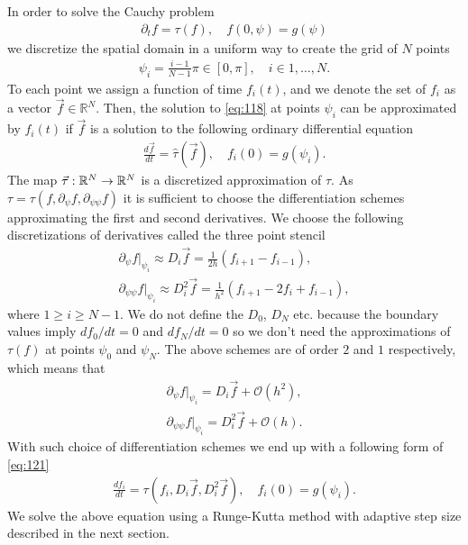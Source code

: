 In order to solve the Cauchy problem
\begin{align}
  \label{eq:118}
  \partial_t f=\tau(f),\quad f(0,\psi)=g(\psi)
\end{align}
we discretize the spatial domain in a uniform way to create the grid
of $N$ points
\begin{align}
  \label{eq:107}
  \psi_i=\frac{i-1}{N-1}\pi\in[0,\pi],\quad i\in{1,\dots,N}.
\end{align}
To each point we assign a function of time $f_i(t)$, and we denote the
set of $f_i$ as a vector $\vec{f}\in\mathbb{R}^N$. Then, the solution
to \eqref{eq:118} at points $\psi_i$ can be approximated by $f_i(t)$
if $\vec{f}$ is a solution to the following ordinary differential
equation
\begin{align}
  \label{eq:121}
  \frac{d \vec{f}}{dt}=\hat{\tau}(\vec{f}),\quad f_i(0)=g(\psi_i).
\end{align}
The map $\vec{\tau}:\mathbb{R}^N\rightarrow \mathbb{R}^N$ is a discretized
approximation of $\tau$. As $\tau=\tau(f,\partial_\psi
f,\partial_{\psi\psi} f)$ it is sufficient to choose the
differentiation schemes approximating the first and second
derivatives. We choose the following discretizations of derivatives
called the three point stencil
\begin{align}
  \label{eq:123}
  \partial_\psi f\big|_{\psi_i}\approx D_i\vec{f}=\frac{1}{2h}(f_{i+1}-f_{i-1}),\\
  \partial_{\psi\psi} f\big|_{\psi_i}\approx D_i^2\vec{f}=\frac{1}{h^2}(f_{i+1}-2f_i+f_{i-1}),
\end{align}
where $1\ge i\ge N-1$. We do not define the $D_0$, $D_N$ etc. because
the boundary values imply $df_0/dt=0$ and $df_N/dt=0$ so we don't need
the approximations of $\tau(f)$ at points $\psi_0$ and $\psi_N$. The
above schemes are of order $2$ and $1$ respectively, which means that
\begin{align}
  \label{eq:124}
  \partial_\psi f\big|_{\psi_i}= D_i\vec{f}+\mathcal{O}(h^2),\\
  \partial_{\psi\psi} f\big|_{\psi_i}= D_i^2\vec{f}+\mathcal{O}(h).
\end{align}
With such choice of differentiation schemes we end up with a following
form of \eqref{eq:121}
\begin{align}
  \label{eq:125}
  \frac{d f_i}{dt}=\tau(f_i,D_i\vec{f},D_i^2\vec{f}),\quad f_i(0)=g(\psi_i).
\end{align}
We solve the above equation using a Runge-Kutta method with adaptive
step size described in the next section.

